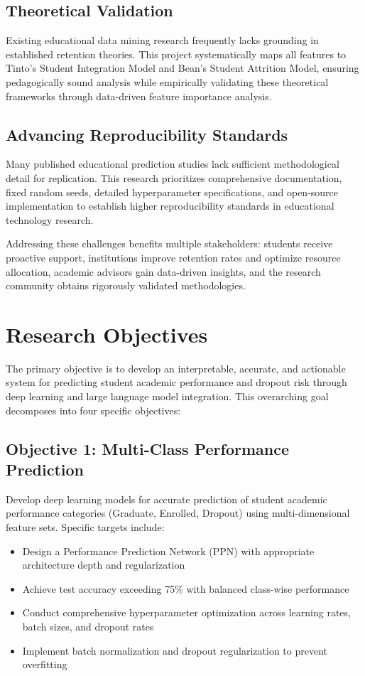 \subsection{Theoretical Validation}

Existing educational data mining research frequently lacks grounding in established retention theories. This project systematically maps all features to Tinto's Student Integration Model and Bean's Student Attrition Model, ensuring pedagogically sound analysis while empirically validating these theoretical frameworks through data-driven feature importance analysis.

\subsection{Advancing Reproducibility Standards}

Many published educational prediction studies lack sufficient methodological detail for replication. This research prioritizes comprehensive documentation, fixed random seeds, detailed hyperparameter specifications, and open-source implementation to establish higher reproducibility standards in educational technology research.

Addressing these challenges benefits multiple stakeholders: students receive proactive support, institutions improve retention rates and optimize resource allocation, academic advisors gain data-driven insights, and the research community obtains rigorously validated methodologies.

\section{Research Objectives}

The primary objective is to develop an interpretable, accurate, and actionable system for predicting student academic performance and dropout risk through deep learning and large language model integration. This overarching goal decomposes into four specific objectives:

\subsection{Objective 1: Multi-Class Performance Prediction}

Develop deep learning models for accurate prediction of student academic performance categories (Graduate, Enrolled, Dropout) using multi-dimensional feature sets. Specific targets include:
\begin{itemize}
\item Design a Performance Prediction Network (PPN) with appropriate architecture depth and regularization
\item Achieve test accuracy exceeding 75\% with balanced class-wise performance
\item Conduct comprehensive hyperparameter optimization across learning rates, batch sizes, and dropout rates
\item Implement batch normalization and dropout regularization to prevent overfitting
\end{itemize}

